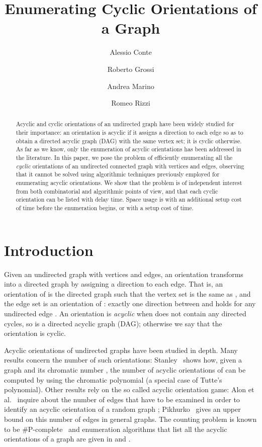 \documentclass{llncs}
\title{Enumerating Cyclic Orientations of a Graph}
\author{Alessio Conte\inst{1} \and Roberto Grossi\inst{1} \and Andrea Marino\inst{1} \and Romeo Rizzi\inst{2}}
\institute{Universit\`a di Pisa, \email{conte,grossi,marino@di.unipi.it} \and Universit\`a di Verona, \email{rizzi@di.univr.it}}
\begin{document}
\maketitle

\begin{abstract}
  Acyclic and cyclic orientations of an undirected graph have been
  widely studied for their importance: an orientation is acyclic if it
  assigns a direction to each edge so as to obtain a directed acyclic
  graph (DAG) with the same vertex set; it is cyclic otherwise. As far
  as we know, only the enumeration of acyclic orientations has been
  addressed in the literature. In this paper, we pose the problem of
  efficiently enumerating all the \emph{cyclic} orientations of an
  undirected connected graph with  vertices and  edges,
  observing that it cannot be solved using algorithmic techniques
  previously employed for enumerating acyclic orientations.  We show
  that the problem is of independent interest from both combinatorial
  and algorithmic points of view, and that each cyclic orientation can
  be listed with  delay time. Space usage is  with
  an additional setup cost of  time before the enumeration
  begins, or  with a setup cost of  time.
\end{abstract}


\section{Introduction}
\label{sec:intro}
Given an undirected graph  with  vertices and 
edges, an orientation transforms  into a directed graph 
by assigning a direction to each edge. That is, an orientation of 
is the directed graph  such that the vertex set
 is the same as , and the edge set  is an orientation
of : exactly one direction between  and
 holds for any undirected edge .  An
orientation  is \emph{acyclic} when  does not
contain any directed cycles, so  is a directed acyclic graph
(DAG); otherwise we say that the orientation  is cyclic.


Acyclic orientations of undirected graphs have been studied in
depth. Many results concern the number of such orientations:
Stanley~\cite{stanley87} shows how, given a graph  and its
chromatic number , the number of acyclic orientations of  can
be computed by using the chromatic polynomial (a special case of
Tutte's polynomial). Other results rely on the so called acyclic
orientation game: Alon et al.~\cite{alon1995acyclic} inquire about the
number of edges that have to be examined in order to identify an
acyclic orientation of a random graph ; Pikhurko~\cite{CPC:6776456}
gives an upper bound on this number of edges in general graphs.  The
counting problem is known to be \#P-complete~\cite{linial1986hard} and
enumeration algorithms that list all the acyclic orientations of a
graph are given in \cite{Barbosa199971} and \cite{Squire1998275}.
\end{document}
